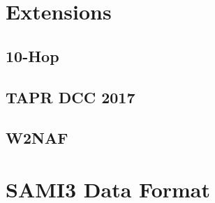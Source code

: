 \documentclass[12pt,letterpaper]{article}
\begin{document}
\newpage
\begin{appendices}

  \section{Extensions}
  \label{sec:extensions}

  \subsection{10-Hop}
  \label{sec:extensions:10hop}

  \subsection{TAPR DCC 2017}
  \label{sec:extensions:dcc2017}

  \subsection{W2NAF}
  \label{sec:extensions:w2naf}

  \section{SAMI3 Data Format}
  \label{sec:sami3_df}

\end{appendices}
\end{document}
